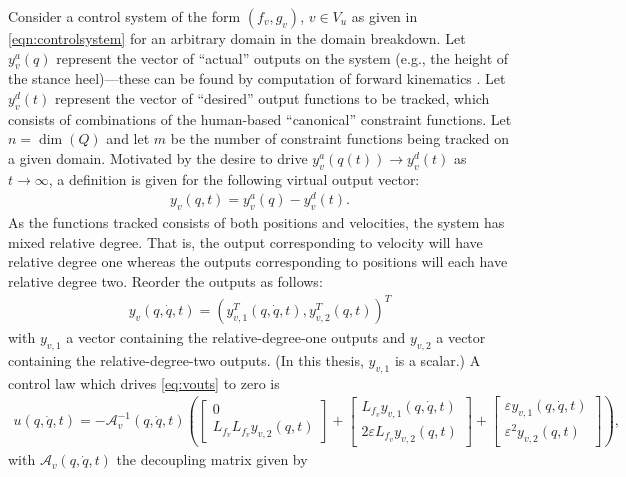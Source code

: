 Consider a control system of the form $(f_{v},g_{v})$, $v \in V_{u}$ as given in
\eqref{eqn:controlsystem} for an arbitrary domain in the domain breakdown. Let
$y^{a}_{v}(q)$ represent the vector of ``actual'' outputs on the system (e.g.,
the height of the stance heel)---these can be found by computation of forward
kinematics \cite{Murray94}. Let $y^{d}_{v}(t)$ represent the vector of
``desired'' output functions to be tracked, which consists of combinations of
the human-based ``canonical'' constraint functions. Let $n = \dim(Q)$ and let
$m$ be the number of constraint functions being tracked on a given
domain. Motivated by the desire to drive $y^{a}_{v}(q(t)) \to y^{d}_{v}(t)$ as
$t \to \infty$, a definition is given for the following virtual output vector:
\begin{align}
  \label{eq:virtout}
  y_v(q,t) = y^a_v(q) - y^d_v(t).
\end{align}
As the functions tracked consists of both positions and velocities, the system
has mixed relative degree.
%
That is, the output corresponding to velocity will have relative degree one
whereas the outputs corresponding to positions will each have relative degree
two.
%
Reorder the outputs as follows:
\begin{align}
  \label{eq:vouts}
  y_v(q, {\dot q}, t) = (y_{v,1}^T(q, {\dot q}, t),y_{v,2}^T(q, t))^T
\end{align}
with $y_{v,1}$ a vector containing the relative-degree-one outputs and $y_{v,2}$
a vector containing the relative-degree-two outputs.
%
(In this thesis, $y_{v,1}$ is a scalar.)
%
A control law which drives \eqref{eq:vouts} to zero is
\begin{align*}
  u(q, {\dot q}, t) = -\mathcal{A}_{v}^{-1}(q, {\dot q}, t)
  \left(\left[\!\!\begin{array}{c}
      0\\
      L_{f_{v}} L_{f_{v}} y_{v,2}(q, t)
    \end{array}\!\!\right]
  + \left[\!\!\begin{array}{c}
      L_{f_{v}} y_{v,1}(q, {\dot q}, t)\\
      2 \varepsilon L_{f_{v}} y_{v,2}(q, t)
    \end{array}\!\!\right] +
  \left[\!\!\begin{array}{c}
      \varepsilon y_{v,1}(q, {\dot q}, t)\\
      \varepsilon^2 y_{v,2}(q, t)
    \end{array}\!\!\right]\right),
\end{align*}
with $\mathcal{A}_{v}(q, {\dot q},t)$ the decoupling matrix given by

